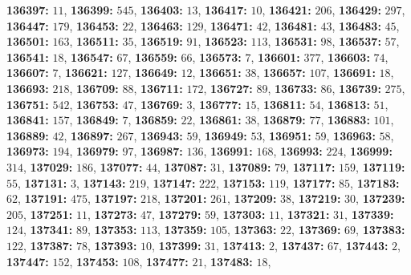 \textsf{\bfseries 136397:} $11$, \textsf{\bfseries 136399:} $545$, \textsf{\bfseries 136403:} $13$, \textsf{\bfseries 136417:} $10$, \textsf{\bfseries 136421:} $206$, \textsf{\bfseries 136429:} $297$, \textsf{\bfseries 136447:} $179$, \textsf{\bfseries 136453:} $22$, \textsf{\bfseries 136463:} $129$, \textsf{\bfseries 136471:} $42$, \textsf{\bfseries 136481:} $43$, \textsf{\bfseries 136483:} $45$, \textsf{\bfseries 136501:} $163$, \textsf{\bfseries 136511:} $35$, \textsf{\bfseries 136519:} $91$, \textsf{\bfseries 136523:} $113$, \textsf{\bfseries 136531:} $98$, \textsf{\bfseries 136537:} $57$, \textsf{\bfseries 136541:} $18$, \textsf{\bfseries 136547:} $67$, \textsf{\bfseries 136559:} $66$, \textsf{\bfseries 136573:} $7$, \textsf{\bfseries 136601:} $377$, \textsf{\bfseries 136603:} $74$, \textsf{\bfseries 136607:} $7$, \textsf{\bfseries 136621:} $127$, \textsf{\bfseries 136649:} $12$, \textsf{\bfseries 136651:} $38$, \textsf{\bfseries 136657:} $107$, \textsf{\bfseries 136691:} $18$, \textsf{\bfseries 136693:} $218$, \textsf{\bfseries 136709:} $88$, \textsf{\bfseries 136711:} $172$, \textsf{\bfseries 136727:} $89$, \textsf{\bfseries 136733:} $86$, \textsf{\bfseries 136739:} $275$, \textsf{\bfseries 136751:} $542$, \textsf{\bfseries 136753:} $47$, \textsf{\bfseries 136769:} $3$, \textsf{\bfseries 136777:} $15$, \textsf{\bfseries 136811:} $54$, \textsf{\bfseries 136813:} $51$, \textsf{\bfseries 136841:} $157$, \textsf{\bfseries 136849:} $7$, \textsf{\bfseries 136859:} $22$, \textsf{\bfseries 136861:} $38$, \textsf{\bfseries 136879:} $77$, \textsf{\bfseries 136883:} $101$, \textsf{\bfseries 136889:} $42$, \textsf{\bfseries 136897:} $267$, \textsf{\bfseries 136943:} $59$, \textsf{\bfseries 136949:} $53$, \textsf{\bfseries 136951:} $59$, \textsf{\bfseries 136963:} $58$, \textsf{\bfseries 136973:} $194$, \textsf{\bfseries 136979:} $97$, \textsf{\bfseries 136987:} $136$, \textsf{\bfseries 136991:} $168$, \textsf{\bfseries 136993:} $224$, \textsf{\bfseries 136999:} $314$, \textsf{\bfseries 137029:} $186$, \textsf{\bfseries 137077:} $44$, \textsf{\bfseries 137087:} $31$, \textsf{\bfseries 137089:} $79$, \textsf{\bfseries 137117:} $159$, \textsf{\bfseries 137119:} $55$, \textsf{\bfseries 137131:} $3$, \textsf{\bfseries 137143:} $219$, \textsf{\bfseries 137147:} $222$, \textsf{\bfseries 137153:} $119$, \textsf{\bfseries 137177:} $85$, \textsf{\bfseries 137183:} $62$, \textsf{\bfseries 137191:} $475$, \textsf{\bfseries 137197:} $218$, \textsf{\bfseries 137201:} $261$, \textsf{\bfseries 137209:} $38$, \textsf{\bfseries 137219:} $30$, \textsf{\bfseries 137239:} $205$, \textsf{\bfseries 137251:} $11$, \textsf{\bfseries 137273:} $47$, \textsf{\bfseries 137279:} $59$, \textsf{\bfseries 137303:} $11$, \textsf{\bfseries 137321:} $31$, \textsf{\bfseries 137339:} $124$, \textsf{\bfseries 137341:} $89$, \textsf{\bfseries 137353:} $113$, \textsf{\bfseries 137359:} $105$, \textsf{\bfseries 137363:} $22$, \textsf{\bfseries 137369:} $69$, \textsf{\bfseries 137383:} $122$, \textsf{\bfseries 137387:} $78$, \textsf{\bfseries 137393:} $10$, \textsf{\bfseries 137399:} $31$, \textsf{\bfseries 137413:} $2$, \textsf{\bfseries 137437:} $67$, \textsf{\bfseries 137443:} $2$, \textsf{\bfseries 137447:} $152$, \textsf{\bfseries 137453:} $108$, \textsf{\bfseries 137477:} $21$, \textsf{\bfseries 137483:} $18$, 
